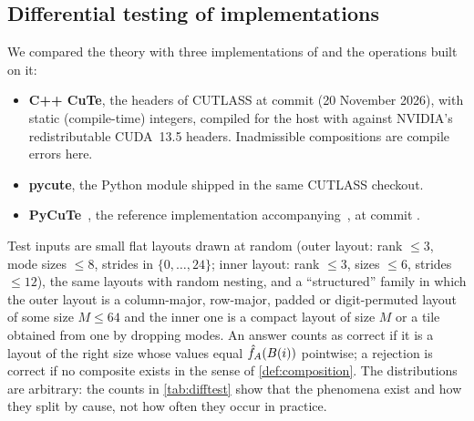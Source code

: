 \subsection{Differential testing of implementations}\label{sec:testing}

We compared the theory with three implementations of  and the operations built
on it:
\begin{itemize}[leftmargin=1.4em,itemsep=1pt]
\item \textbf{C++ CuTe}, the headers of CUTLASS at commit  (20 November 2026), with
 static (compile-time) integers, compiled for the host with  against NVIDIA's
 redistributable CUDA~13.5 headers. Inadmissible compositions are compile errors here.
\item \textbf{pycute}, the Python module shipped in the same CUTLASS checkout.
\item \textbf{PyCuTe}~\cite{pycute}, the reference implementation accompanying~\cite{cecka2026}, at
 commit .
\end{itemize}
Test inputs are small flat layouts drawn at random (outer layout: rank $\le3$, mode sizes
$\le 8$, strides in $\{0,\dots,24\}$; inner layout: rank $\le 3$, sizes $\le6$, strides $\le12$),
the same layouts with random nesting, and a ``structured'' family in which the outer layout is a
column-major, row-major, padded or digit-permuted layout of some size $M\le64$ and the inner one
is a compact layout of size $M$ or a tile obtained from one by dropping modes. An answer counts as
correct if it is a layout of the right size whose values equal $\hat{f}_{A}(B(i))$ pointwise; a
rejection is correct if no composite exists in the sense of \cref{def:composition}. The
distributions are arbitrary: the counts in \cref{tab:difftest} show that the phenomena exist and
how they split by cause, not how often they occur in practice.

